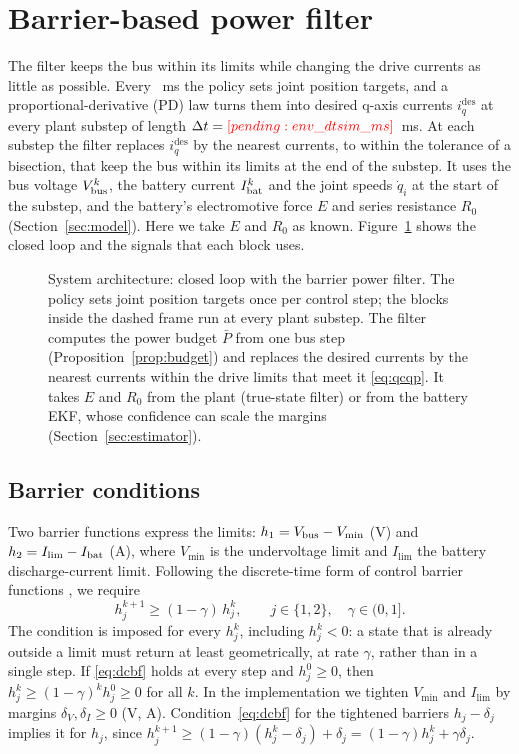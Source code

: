 \section{Barrier-based power filter}\label{sec:filter}
The filter keeps the bus within its limits while changing the drive currents as little as possible. Every ~ms the policy sets joint position targets, and a proportional-derivative (PD) law turns them into desired q-axis currents $i_q^{\mathrm{des}}$ at every plant substep of length $\Delta t = \res{env_dtsim_ms}$~ms. At each substep the filter replaces $i_q^{\mathrm{des}}$ by the nearest currents, to within the tolerance of a bisection, that keep the bus within its limits at the end of the substep. It uses the bus voltage $V_{\mathrm{bus}}^k$, the battery current $I_{\mathrm{bat}}^k$ and the joint speeds $\dot q_i$ at the start of the substep, and the battery's electromotive force $E$ and series resistance $R_0$ (Section~\ref{sec:model}). Here we take $E$ and $R_0$ as known. Figure~\ref{fig:arch} shows the closed loop and the signals that each block uses.
\begin{figure}[tbp]\centering{}\caption{System architecture: closed loop with the barrier power filter. The policy sets joint position targets once per control step; the blocks inside the dashed frame run at every plant substep. The filter computes the power budget $\bar P$ from one bus step (Proposition~\ref{prop:budget}) and replaces the desired currents by the nearest currents within the drive limits that meet it \eqref{eq:qcqp}. It takes $E$ and $R_0$ from the plant (true-state filter) or from the battery EKF, whose confidence can scale the margins (Section~\ref{sec:estimator}).}\label{fig:arch}\end{figure}

\subsection{Barrier conditions}
Two barrier functions express the limits: $h_1 = V_{\mathrm{bus}} - V_{\min}$ (V) and $h_2 = I_{\lim} - I_{\mathrm{bat}}$ (A), where $V_{\min}$ is the undervoltage limit and $I_{\lim}$ the battery discharge-current limit. Following the discrete-time form of control barrier functions \cite{agrawal2017dcbf}, we require
\begin{equation}
h_j^{k+1} \ge (1-\gamma)\,h_j^k, \qquad j\in\{1,2\},\quad \gamma\in(0,1].
\label{eq:dcbf}
\end{equation}
The condition is imposed for every $h_j^k$, including $h_j^k<0$: a state that is already outside a limit must return at least geometrically, at rate $\gamma$, rather than in a single step. If \eqref{eq:dcbf} holds at every step and $h_j^0\ge 0$, then $h_j^k \ge (1-\gamma)^k h_j^0 \ge 0$ for all $k$. In the implementation we tighten $V_{\min}$ and $I_{\lim}$ by margins $\delta_V,\delta_I\ge0$ (V, A). Condition~\eqref{eq:dcbf} for the tightened barriers $h_j-\delta_j$ implies it for $h_j$, since $h_j^{k+1} \ge (1-\gamma)(h_j^k-\delta_j)+\delta_j = (1-\gamma)h_j^k + \gamma\delta_j$.

